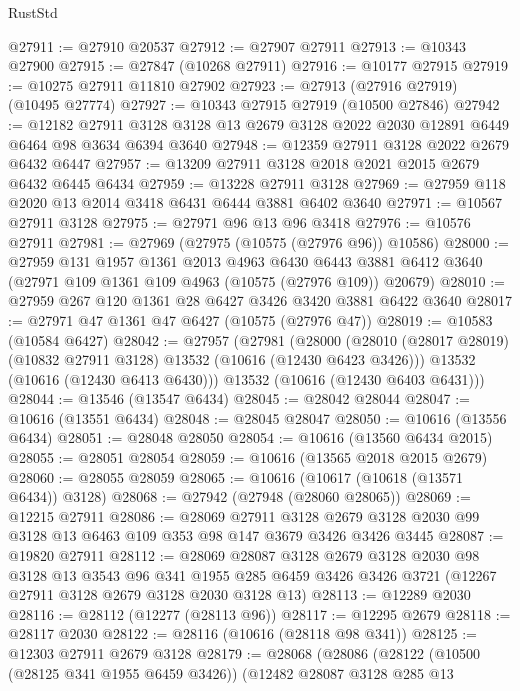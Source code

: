 \begin{lexlean}{RustStd}
\begin{coremodule}
@27911 := @27910 @20537
@27912 := @27907 @27911
@27913 := @10343 @27900
@27915 := @27847 (@10268 @27911)
@27916 := @10177 @27915
@27919 := @10275 @27911 @11810 @27902
@27923 := @27913 (@27916 @27919) (@10495 @27774)
@27927 := @10343 @27915 @27919 (@10500 @27846)
@27942 := @12182
    @27911
    @3128
    @3128
    @13
    @2679
    @3128
    @2022
    @2030
    @12891
    @6449
    @6464
    @98
    @3634
    @6394
    @3640
@27948 := @12359 @27911 @3128 @2022 @2679 @6432 @6447
@27957 := @13209 @27911 @3128 @2018 @2021 @2015 @2679 @6432 @6445 @6434
@27959 := @13228 @27911 @3128
@27969 := @27959 @118 @2020 @13 @2014 @3418 @6431 @6444 @3881 @6402 @3640
@27971 := @10567 @27911 @3128
@27975 := @27971 @96 @13 @96 @3418
@27976 := @10576 @27911
@27981 := @27969 (@27975 (@10575 (@27976 @96)) @10586)
@28000 := @27959
    @131
    @1957
    @1361
    @2013
    @4963
    @6430
    @6443
    @3881
    @6412
    @3640
    (@27971 @109 @1361 @109 @4963 (@10575 (@27976 @109)) @20679)
@28010 := @27959 @267 @120 @1361 @28 @6427 @3426 @3420 @3881 @6422 @3640
@28017 := @27971 @47 @1361 @47 @6427 (@10575 (@27976 @47))
@28019 := @10583 (@10584 @6427)
@28042 := @27957
    (@27981
      (@28000
        (@28010 (@28017 @28019) (@10832 @27911 @3128) @13532 (@10616 (@12430 @6423 @3426)))
        @13532
        (@10616 (@12430 @6413 @6430)))
      @13532
      (@10616 (@12430 @6403 @6431)))
@28044 := @13546 (@13547 @6434)
@28045 := @28042 @28044
@28047 := @10616 (@13551 @6434)
@28048 := @28045 @28047
@28050 := @10616 (@13556 @6434)
@28051 := @28048 @28050
@28054 := @10616 (@13560 @6434 @2015)
@28055 := @28051 @28054
@28059 := @10616 (@13565 @2018 @2015 @2679)
@28060 := @28055 @28059
@28065 := @10616 (@10617 (@10618 (@13571 @6434)) @3128)
@28068 := @27942 (@27948 (@28060 @28065))
@28069 := @12215 @27911
@28086 := @28069
    @27911
    @3128
    @2679
    @3128
    @2030
    @99
    @3128
    @13
    @6463
    @109
    @353
    @98
    @147
    @3679
    @3426
    @3426
    @3445
@28087 := @19820 @27911
@28112 := @28069
    @28087
    @3128
    @2679
    @3128
    @2030
    @98
    @3128
    @13
    @3543
    @96
    @341
    @1955
    @285
    @6459
    @3426
    @3426
    @3721
    (@12267 @27911 @3128 @2679 @3128 @2030 @3128 @13)
@28113 := @12289 @2030
@28116 := @28112 (@12277 (@28113 @96))
@28117 := @12295 @2679
@28118 := @28117 @2030
@28122 := @28116 (@10616 (@28118 @98 @341))
@28125 := @12303 @27911 @2679 @3128
@28179 := @28068
    (@28086
      (@28122
        (@10500 (@28125 @341 @1955 @6459 @3426))
        (@12482
          @28087
          @3128
          @285
          @13

\end{coremodule}
\end{lexlean}
